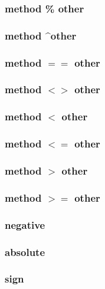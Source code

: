 \subsubsection{method \% other}
	
\subsubsection{method \textasciicircum other}

\subsubsection{method $==$ other}

\subsubsection{method $<>$ other}

\subsubsection{method $<$ other}

\subsubsection{method $<=$ other}

\subsubsection{method $>$ other}

\subsubsection{method $>=$ other}

\subsubsection{negative}

\subsubsection{absolute}

\subsubsection{sign}
